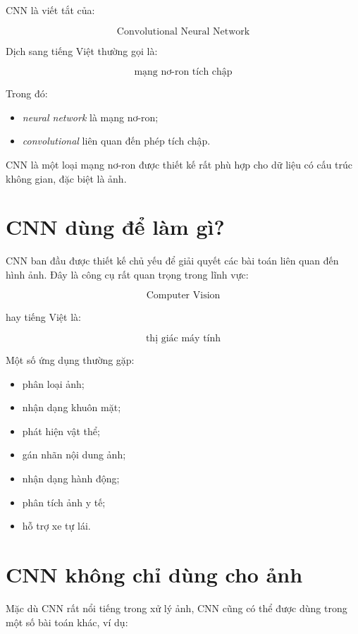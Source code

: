 \documentclass[12pt,a4paper]{report}
\begin{document}
CNN là viết tắt của:

\[
    \text{Convolutional Neural Network}
\]

Dịch sang tiếng Việt thường gọi là:

\[
    \text{mạng nơ-ron tích chập}
\]

Trong đó:

\begin{itemize}
    \item \textit{neural network} là mạng nơ-ron;
    \item \textit{convolutional} liên quan đến phép tích chập.
\end{itemize}

\begin{ghinho}
CNN là một loại mạng nơ-ron được thiết kế rất phù hợp cho dữ liệu có cấu trúc không gian, đặc biệt là ảnh.
\end{ghinho}

\section{CNN dùng để làm gì?}

CNN ban đầu được thiết kế chủ yếu để giải quyết các bài toán liên quan đến hình ảnh. Đây là công cụ rất quan trọng trong lĩnh vực:

\[
    \text{Computer Vision}
\]

hay tiếng Việt là:

\[
    \text{thị giác máy tính}
\]

Một số ứng dụng thường gặp:

\begin{itemize}
    \item phân loại ảnh;
    \item nhận dạng khuôn mặt;
    \item phát hiện vật thể;
    \item gán nhãn nội dung ảnh;
    \item nhận dạng hành động;
    \item phân tích ảnh y tế;
    \item hỗ trợ xe tự lái.
\end{itemize}

\section{CNN không chỉ dùng cho ảnh}

Mặc dù CNN rất nổi tiếng trong xử lý ảnh, CNN cũng có thể được dùng trong một số bài toán khác, ví dụ:
\end{document}
